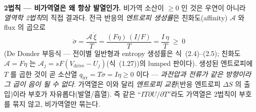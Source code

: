 \documentclass[11pt,a4paper]{article}
\newcommand{\drive}{\mathrm{drive}}
\newcommand{\irr}{\mathrm{irr}}
\begin{document}
\textbf{2법칙 — 비가역열은 왜 항상 발열인가.} 비가역 소산이 $\ge0$ 인 것은 우연이 아니라 \emph{열역학 2법칙}의
직접 결과다. 전극 반응의 \emph{엔트로피 생성률}은 친화도(affinity) $\mathcal A$ 와 flux 의 곱으로
\begin{equation}
\dot\sigma=\frac{\mathcal A\,\dot\xi}{T}=\frac{(F\eta)\,(I/F)}{T}=\frac{I\,\eta}{T}\ \ge\ 0
\label{eq:h_entprod}
\end{equation}
(De Donder 부등식 — 전이별 일반형과 entropy 생성률은 식~(2.4)–(2.5); 친화도 $\mathcal A=F\eta$ 는
$\mathcal A_j=sF(V_\drive-U_j)$(식~(1.27))의 lumped 판이다). 생성된
엔트로피에 $T$ 를 곱한 것이 곧 소산열 $q_\irr=T\dot\sigma=I\eta\ge0$ 이다 — \emph{과전압과 전류가 같은 방향이라
그 곱이 음이 될 수 없다}. 가역열은 이와 달리 \emph{엔트로피 교환}(반응 엔트로피 $\Delta S$ 의 출입)이라 부호가
자유롭다(발열/흡열). 즉 같은 ``$IT\partial U/\partial T$''라도 가역열은 2법칙이 부호를 묶지 않고, 비가역열만 묶는다.
\end{document}
